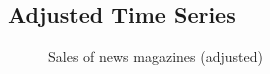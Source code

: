 \documentclass[12pt,a4paper,notitlepage]{article}
\begin{document}
\begin{appendices}
\subsection{Adjusted Time Series}

\begin{figure}[H]
		\caption{Sales of news magazines (adjusted)}
		\centering
		\label{fig_arima_sales_fss}
\end{figure}


\end{appendices}
\end{document}
